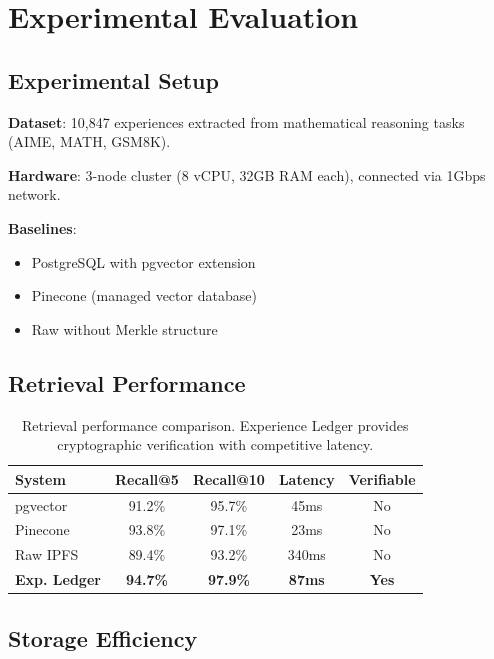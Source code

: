 \section{Experimental Evaluation}

\label{sec:evaluation}

\subsection{Experimental Setup}

\textbf{Dataset}: 10,847 experiences extracted from mathematical reasoning tasks (AIME, MATH, GSM8K).

\textbf{Hardware}: 3-node \IPFS{} cluster (8 vCPU, 32GB RAM each), connected via 1Gbps network.

\textbf{Baselines}:
\begin{itemize}
    \item PostgreSQL with pgvector extension
    \item Pinecone (managed vector database)
    \item Raw \IPFS{} without Merkle structure
\end{itemize}

\subsection{Retrieval Performance}

\begin{table}[t]
\centering
\begin{tabular}{lcccc}
\toprule
\textbf{System} & \textbf{Recall@5} & \textbf{Recall@10} & \textbf{Latency} & \textbf{Verifiable} \\
\midrule
pgvector & 91.2\% & 95.7\% & 45ms & No \\
Pinecone & 93.8\% & 97.1\% & 23ms & No \\
Raw IPFS & 89.4\% & 93.2\% & 340ms & No \\
\textbf{Exp. Ledger} & \textbf{94.7\%} & \textbf{97.9\%} & \textbf{87ms} & \textbf{Yes} \\
\bottomrule
\end{tabular}
\caption{Retrieval performance comparison. Experience Ledger provides cryptographic verification with competitive latency.}
\label{tab:retrieval}
\end{table}

\subsection{Storage Efficiency}

